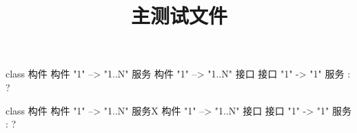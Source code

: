 \documentclass{ctexart}
\title{主测试文件}
\begin{document}
\lipsum[1]


\begin{plantuml}[width=0.4\textwidth]
class 构件
构件 "1" --> "1..N" 服务
构件 "1" --> "1..N" 接口
接口 "1" -> "1" 服务 : ?
\end{plantuml}

\lipsum[2]

\begin{plantuml}
class 构件
构件 "1" --> "1..N" 服务X
构件 "1" --> "1..N" 接口
接口 "1" -> "1" 服务 : ?
\end{plantuml}

\lipsum[3]
\end{document}
